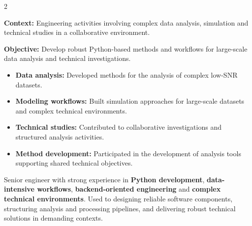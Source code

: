 \documentclass[8pt,a4paper,ragged2e,withhyper]{../_shared/altacv}
\begin{document}
\begin{paracol}{2}

\textbf{Context:} Engineering activities involving complex data analysis, simulation and technical studies in a collaborative environment.

\textbf{Objective:} Develop robust Python-based methods and workflows for large-scale data analysis and technical investigations.

\begin{itemize}
\item \textbf{Data analysis:} Developed methods for the analysis of complex low-SNR datasets.
\item \textbf{Modeling workflows:} Built simulation approaches for large-scale datasets and complex technical environments.
\item \textbf{Technical studies:} Contributed to collaborative investigations and structured analysis activities.
\item \textbf{Method development:} Participated in the development of analysis tools supporting shared technical objectives.
\end{itemize}




\switchcolumn

Senior engineer with strong experience in \textbf{Python development}, \textbf{data-intensive workflows}, \textbf{backend-oriented engineering} and \textbf{complex technical environments}. Used to designing reliable software components, structuring analysis and processing pipelines, and delivering robust technical solutions in demanding contexts.


\end{paracol}
\end{document}

